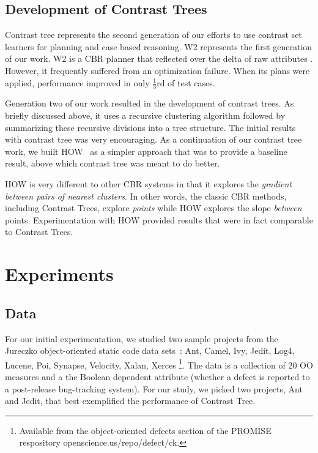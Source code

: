 \documentclass[conference]{IEEEtran}
\begin{document}
	\subsection{Development of Contrast Trees}
	Contrast tree represents the second generation of our efforts to use contrast set learners for planning and case based reasoning. W2 represents the first generation of our work. W2 is a CBR planner that reflected over the delta of raw attributes \cite{6600685}. However, it frequently suffered from an optimization failure. When its plans were applied, performance improved in only $\tfrac{1}{3}$rd of test cases. 
	
	Generation two of our work resulted in the development of contrast trees. As briefly discussed above, it uses a recursive clustering algorithm followed by summarizing these recursive divisions into a tree structure. The initial results with contrast tree was very encouraging. As a continuation of our contrast tree work, we built HOW~\cite{HOW} as a simpler approach that was to provide a baseline result, above which contrast tree was meant to do better. 
	
	HOW is very different to other CBR systems in that it explores the {\em gradient between pairs of nearest clusters}. In other words, the classic CBR methods, including Contrast Trees, explore {\em points} while
HOW explores the slope {\em between} points. Experimentation with HOW provided results that were in fact comparable to Contrast Trees. 
	
	\section{Experiments}
	\subsection{Data}
	For our initial experimentation, we studied two sample projects from the Jureczko object-oriented static code data sets~\cite{jureczko10}: Ant, Camel, Ivy, Jedit,   Log4, Lucene, Poi, Synapse, Velocity, Xalan, Xerces \footnote{Available from the object-oriented defects section of the PROMISE respository openscience.us/repo/defect/ck.}. The data is a collection of 20 OO measures and a the Boolean dependent attribute (whether a defect is reported to a post-release bug-tracking system). For our study, we picked two projects, Ant and Jedit, that best exemplified the performance of Contrast Tree. 
\end{document}
